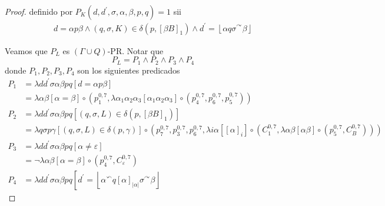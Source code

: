 \begin{lemma}
\begin{proof}
    definido por $P_{K}(d,d^{\prime },\sigma ,\alpha ,\beta ,p,q)=1$ sii
    \begin{eqnarray*}
      d=\alpha p\beta \wedge
      (q,\sigma ,K)\in \delta \left( p,\left[ \beta B\right] _{1}\right) \wedge
      d^{\prime }=\left\lfloor \alpha q\sigma ^{\curvearrowright }\beta \right\rfloor
    \end{eqnarray*}
    \par \noindent Veamos que $P_L$ es $(\Gamma \cup Q)$-PR. Notar que
    \[
      P_L = P_1 \land P_2 \land P_3 \land P_4
    \]
    donde $P_1, P_2,  P_3, P_4$ son los siguientes predicados
    \begin{align*}
      P_1 &=  \lambda d d^{\prime}\sigma\alpha\beta p q \left[ d=\alpha p\beta \right] \\
          &=  \lambda \alpha\beta\left[ \alpha=\beta \right]
                \circ (
                  p_{1}^{0,7},
                  \lambda \alpha_1 \alpha_2 \alpha_3 \left[ \alpha_1\alpha_2\alpha_3 \right]
                    \circ (
                      p_{4}^{0,7},
                      p_{6}^{0,7},
                      p_{5}^{0,7}
                    )
                  ) \\[10pt]
      P_2 &=  \lambda d d^{\prime}\sigma\alpha\beta p q
                \left[ (q,\sigma ,L)\in \delta \left( p,\left[ \beta B\right] _{1}\right) \right] \\
          &=  \lambda q\sigma p\gamma \left[ (q,\sigma ,L)\in \delta (p,\gamma )\right]
                \circ (
                  p_{7}^{0,7},
                  p_{3}^{0,7},
                  p_{6}^{0,7},
                  \lambda i\alpha \left[ \left[\alpha\right]_i \right]
                  \circ (
                    C_{1}^{0,7},
                    \lambda \alpha \beta \left[ \alpha\beta \right] \circ (p_{5}^{0,7}, C_{B}^{0,7})
                  )
                ) \\[10pt]
      P_3 &=  \lambda d d^{\prime}\sigma\alpha\beta p q \left[ \alpha \neq \varepsilon \right] \\
          &=  \neg \lambda \alpha\beta \left[ \alpha = \beta \right]
              \circ (
                p_{4}^{0,7},
                C_{\varepsilon}^{0,7}
              ) \\[10pt]
      P_4 &=  \lambda d d^{\prime}\sigma\alpha\beta p q
                \left[
                  d^{\prime } = \left\lfloor \alpha ^{\curvearrowleft }q\left[ \alpha \right]
                  _{\left\vert \alpha \right\vert }\sigma ^{\curvearrowright }\beta \right\rfloor

\end{align*}
\end{proof}
\end{lemma}
